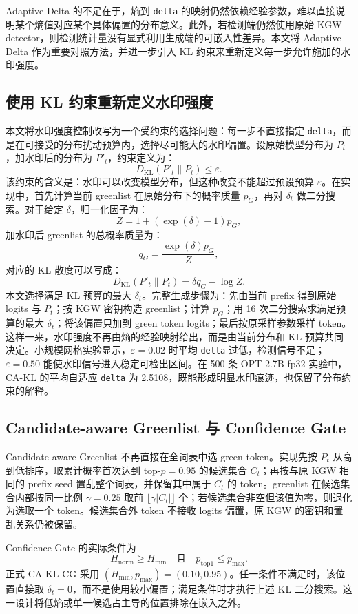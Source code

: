 \documentclass[a4paper,UTF8,zihao=5]{ctexart}
\newcommand{\method}{CA-KL}
\begin{document}
Adaptive Delta 的不足在于，熵到 \texttt{delta} 的映射仍然依赖经验参数，难以直接说明某个熵值对应某个具体偏置的分布意义。此外，若检测端仍然使用原始 KGW detector，则检测统计量没有显式利用生成端的可嵌入性差异。本文将 Adaptive Delta 作为重要对照方法，并进一步引入 KL 约束来重新定义每一步允许施加的水印强度。

\subsection{使用 KL 约束重新定义水印强度}

本文将水印强度控制改写为一个受约束的选择问题：每一步不直接指定 \texttt{delta}，而是在可接受的分布扰动预算内，选择尽可能大的水印偏置。设原始模型分布为 $P_t$，加水印后的分布为 $P'_t$，约束定义为：
\[
    D_{\mathrm{KL}}(P'_t\|P_t)\leq \varepsilon.
\]
该约束的含义是：水印可以改变模型分布，但这种改变不能超过预设预算 $\varepsilon$。在实现中，首先计算当前 greenlist 在原始分布下的概率质量 $p_G$，再对 $\delta_t$ 做二分搜索。对于给定 $\delta$，归一化因子为：
\[
    Z=1+(\exp(\delta)-1)p_G,
\]
加水印后 greenlist 的总概率质量为：
\[
    q_G=\frac{\exp(\delta)p_G}{Z},
\]
对应的 KL 散度可以写成：
\[
    D_{\mathrm{KL}}(P'_t\|P_t)=\delta q_G-\log Z.
\]
本文选择满足 KL 预算的最大 $\delta_t$。完整生成步骤为：先由当前 prefix 得到原始 logits 与 $P_t$；按 KGW 密钥构造 greenlist；计算 $p_G$；用 16 次二分搜索求满足预算的最大 $\delta_t$；将该偏置只加到 green token logits；最后按原采样参数采样 token。这样一来，水印强度不再由熵的经验映射给出，而是由当前分布和 KL 预算共同决定。小规模网格实验显示，$\varepsilon=0.02$ 时平均 \texttt{delta} 过低，检测信号不足；$\varepsilon=0.50$ 能使水印信号进入稳定可检出区间。在 500 条 OPT-2.7B fp32 实验中，\method{} 的平均自适应 \texttt{delta} 为 2.5108，既能形成明显水印痕迹，也保留了分布约束的解释。

\subsection{Candidate-aware Greenlist 与 Confidence Gate}

Candidate-aware Greenlist 不再直接在全词表中选 green token。实现先按 $P_t$ 从高到低排序，取累计概率首次达到 top-$p=0.95$ 的候选集合 $C_t$；再按与原 KGW 相同的 prefix seed 置乱整个词表，并保留其中属于 $C_t$ 的 token。greenlist 在候选集合内部按同一比例 $\gamma=0.25$ 取前 $\lfloor\gamma |C_t|\rfloor$ 个；若候选集合非空但该值为零，则退化为选取一个 token。候选集合外 token 不接收 logits 偏置，原 KGW 的密钥和置乱关系仍被保留。

Confidence Gate 的实际条件为
\[
    H_{\mathrm{norm}}\ge H_{\min}\quad\text{且}\quad p_{\mathrm{top1}}\le p_{\max}.
\]
正式 CA-KL-CG 采用 $(H_{\min},p_{\max})=(0.10,0.95)$。任一条件不满足时，该位置直接取 $\delta_t=0$，而不是使用较小偏置；满足条件时才执行上述 KL 二分搜索。这一设计将低熵或单一候选占主导的位置排除在嵌入之外。
\end{document}
